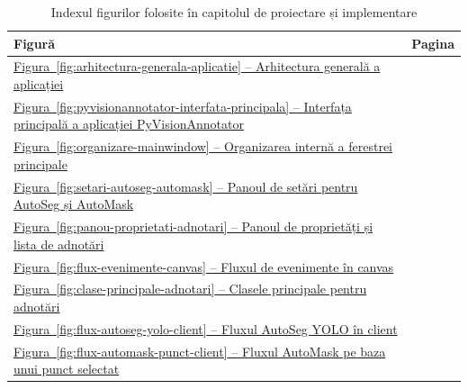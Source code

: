\begin{table}[!htbp]
    \caption{Indexul figurilor folosite în capitolul de proiectare și implementare}
    \centering
    \footnotesize
    \begin{tabular}{|p{}|p{}|}
        \hline
        Figură & Pagina \\
        \hline
        \hyperref[fig:arhitectura-generala-aplicatie]{Figura~\ref*{fig:arhitectura-generala-aplicatie} -- Arhitectura generală a aplicației} &
        \pageref{fig:arhitectura-generala-aplicatie} \\
        \hline
        \hyperref[fig:pyvisionannotator-interfata-principala]{Figura~\ref*{fig:pyvisionannotator-interfata-principala} -- Interfața principală a aplicației PyVisionAnnotator} &
        \pageref{fig:pyvisionannotator-interfata-principala} \\
        \hline
        \hyperref[fig:organizare-mainwindow]{Figura~\ref*{fig:organizare-mainwindow} -- Organizarea internă a ferestrei principale} &
        \pageref{fig:organizare-mainwindow} \\
        \hline
        \hyperref[fig:setari-autoseg-automask]{Figura~\ref*{fig:setari-autoseg-automask} -- Panoul de setări pentru AutoSeg și AutoMask} &
        \pageref{fig:setari-autoseg-automask} \\
        \hline
        \hyperref[fig:panou-proprietati-adnotari]{Figura~\ref*{fig:panou-proprietati-adnotari} -- Panoul de proprietăți și lista de adnotări} &
        \pageref{fig:panou-proprietati-adnotari} \\
        \hline
        \hyperref[fig:flux-evenimente-canvas]{Figura~\ref*{fig:flux-evenimente-canvas} -- Fluxul de evenimente în canvas} &
        \pageref{fig:flux-evenimente-canvas} \\
        \hline
        \hyperref[fig:clase-principale-adnotari]{Figura~\ref*{fig:clase-principale-adnotari} -- Clasele principale pentru adnotări} &
        \pageref{fig:clase-principale-adnotari} \\
        \hline
        \hyperref[fig:flux-autoseg-yolo-client]{Figura~\ref*{fig:flux-autoseg-yolo-client} -- Fluxul AutoSeg YOLO în client} &
        \pageref{fig:flux-autoseg-yolo-client} \\
        \hline
        \hyperref[fig:flux-automask-punct-client]{Figura~\ref*{fig:flux-automask-punct-client} -- Fluxul AutoMask pe baza unui punct selectat} &
        \pageref{fig:flux-automask-punct-client} \\
        \hline

\end{tabular}
\end{table}
